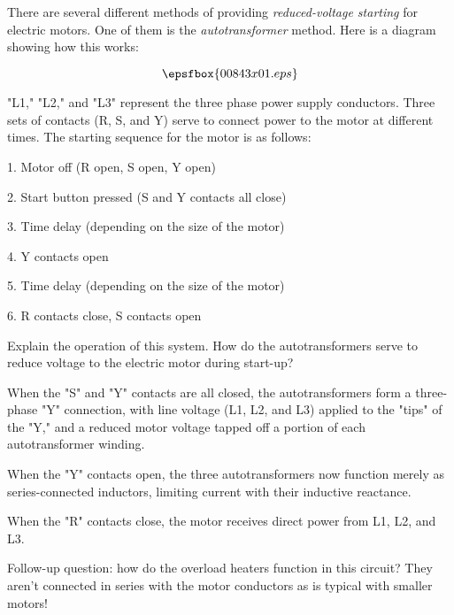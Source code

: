 

There are several different methods of providing {\it reduced-voltage starting} for electric motors.  One of them is the {\it autotransformer} method.  Here is a diagram showing how this works:

$$\epsfbox{00843x01.eps}$$

"L1," "L2," and "L3" represent the three phase power supply conductors.  Three sets of contacts (R, S, and Y) serve to connect power to the motor at different times.  The starting sequence for the motor is as follows:

\medskip
\item{1.} Motor off (R open, S open, Y open) 
\item{2.} Start button pressed (S and Y contacts all close)
\item{3.} Time delay (depending on the size of the motor)
\item{4.} Y contacts open
\item{5.} Time delay (depending on the size of the motor)
\item{6.} R contacts close, S contacts open
\medskip

Explain the operation of this system.  How do the autotransformers serve to reduce voltage to the electric motor during start-up?







When the "S" and "Y" contacts are all closed, the autotransformers form a three-phase "Y" connection, with line voltage (L1, L2, and L3) applied to the "tips" of the "Y," and a reduced motor voltage tapped off a portion of each autotransformer winding.

When the "Y" contacts open, the three autotransformers now function merely as series-connected inductors, limiting current with their inductive reactance.

When the "R" contacts close, the motor receives direct power from L1, L2, and L3.

\vskip 10pt

Follow-up question: how do the overload heaters function in this circuit?  They aren't connected in series with the motor conductors as is typical with smaller motors!

